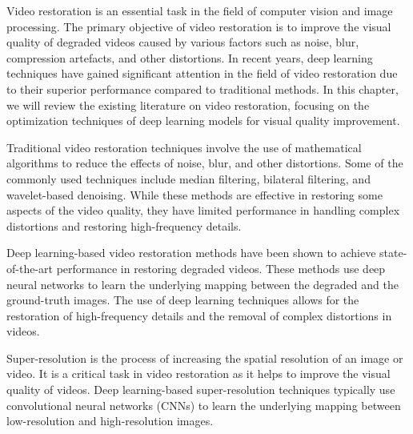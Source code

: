 \label{chap:Background}

Video restoration is an essential task in the field of computer vision and image processing. The primary objective of video restoration is to improve the visual quality of degraded videos caused by various factors such as noise, blur, compression artefacts, and other distortions. In recent years, deep learning techniques have gained significant attention in the field of video restoration due to their superior performance compared to traditional methods. In this chapter, we will review the existing literature on video restoration, focusing on the optimization techniques of deep learning models for visual quality improvement.

Traditional video restoration techniques involve the use of mathematical algorithms to reduce the effects of noise, blur, and other distortions. Some of the commonly used techniques include median filtering, bilateral filtering, and wavelet-based denoising. While these methods are effective in restoring some aspects of the video quality, they have limited performance in handling complex distortions and restoring high-frequency details.

Deep learning-based video restoration methods have been shown to achieve state-of-the-art performance in restoring degraded videos. These methods use deep neural networks to learn the underlying mapping between the degraded and the ground-truth images. The use of deep learning techniques allows for the restoration of high-frequency details and the removal of complex distortions in videos.

Super-resolution is the process of increasing the spatial resolution of an image or video. It is a critical task in video restoration as it helps to improve the visual quality of videos. Deep learning-based super-resolution techniques typically use convolutional neural networks (CNNs) to learn the underlying mapping between low-resolution and high-resolution images.

 
